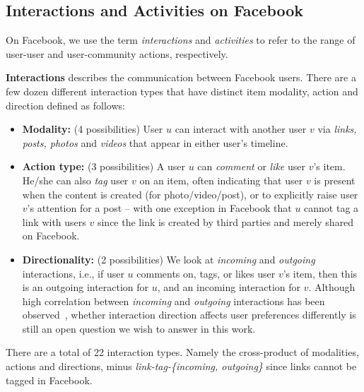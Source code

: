 \subsection{Interactions and Activities on Facebook}

On Facebook, we use the term {\em interactions} and {\em activities}
to refer to the range of user-user and user-community actions,
respectively.

{\bf Interactions} describes the communication between Facebook users. There are a few dozen different interaction types that have distinct item modality, action and direction defined
as follows:
\begin{itemize}
\item \textbf{Modality:} (4 possibilities)
User $u$ can interact with another user $v$ via \textit{links, posts, photos} and \textit{videos} that appear in either user's timeline.

\item \textbf{Action type:} (3 possibilities)
A user $u$ can \textit{comment} or \textit{like} 
user $v$'s item. He/she can also \textit{tag} user $v$ on an 
item, often indicating that user $v$ is present when the content is created (for photo/video/post), 
or to explicitly raise user $v$'s attention for a post -- with one exception in Facebook that $u$ cannot tag a link with users $v$ since the link is created by third parties and merely shared on Facebook.

\item \textbf{Directionality:} (2 possibilities)
We look at \textit{incoming} and \textit{outgoing} interactions, i.e.,
if user $u$ comments on, tags, or likes user $v$'s item,
then this is an outgoing interaction for $u$, and an incoming interaction for $v$.
Although high correlation between \textit{incoming} and \textit{outgoing} interactions 
has been observed~\cite{saez2011high}, whether interaction direction 
affects user preferences differently is still an open question we wish to answer
in this work. 
      								
\end{itemize}

There are a total of 22 interaction types. Namely the cross-product of modalities, actions and directions, minus {\em link-tag-\{incoming, outgoing\}} since links cannot be tagged in Facebook.



